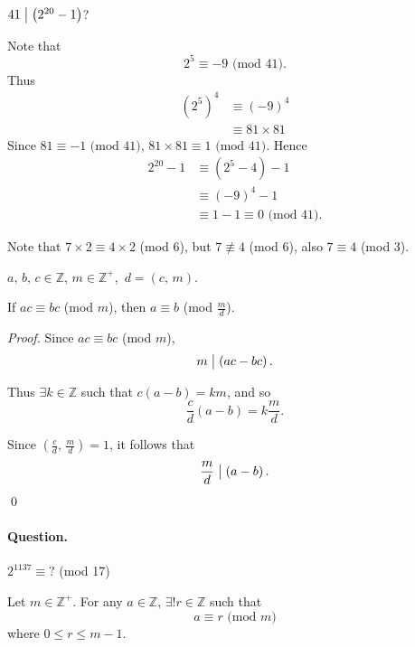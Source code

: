 \begin{example}
    $41 \bigm| \left(2^{20}-1\right)$?

    Note that
    \[
        2^5 \equiv -9 \mbox{ (mod 41)}.  
    \]
    Thus
    \begin{align*}
        \left(2^5\right)^4 &\equiv \left(-9\right)^4 \\
        &\equiv 81 \times 81
    \end{align*}
    Since $81 \equiv -1 \mbox{ (mod 41)}$, $81\times 81 \equiv 1 \mbox{ (mod 41)}$.
    Hence
    \begin{align*}
        2^{20}-1 &\equiv\left(2^5-4\right)-1 \\
        &\equiv \left(-9 \right)^4-1 \\
        &\equiv 1 - 1 \equiv 0 \mbox{ (mod 41)}.
    \end{align*}
\end{example}

Note that $7\times 2 \equiv 4 \times 2$ (mod 6), but $7 \not\equiv 4$ (mod 6),
also $7 \equiv 4$ (mod 3).

\begin{theorem}
    $a,\,b,\,c \in \mathbb{Z}$, $m \in \mathbb{Z}^+$,\, $d=\left(c,\,m\right)$.

    If $ac \equiv bc$ (mod $m$), then $a \equiv b$ (mod $\frac{m}{d}$).
\end{theorem}

\begin{proof}
    Since $ac \equiv bc$ (mod $m$),
    \[
        m \bigm| \left(ac-bc\right).    
    \]

    Thus $\exists k \in \mathbb{Z}$ such that $c\left(a-b\right)=km$,
    and so
    \[
        \frac{c}{d} \left(a-b\right) = k \frac{m}{d}.        
    \]

    Since $\left(\frac{c}{d},\,\frac{m}{d}\right)=1$, it follows that
    \[
        \frac{m}{d} \bigm| \left(a-b\right).    
    \]
    \qed
\end{proof}

\paragraph{Question.} $2^{1137} \equiv \mbox{?}$ (mod 17)

\begin{theorem}
    Let $m\in \mathbb{Z}^+$. For any $a\in \mathbb{Z}$, $\exists! r \in \mathbb{Z}$
    such that
    \[
        a \equiv r \mbox{ (mod $m$)}
    \]
    where $0 \leq r \leq m - 1$.
\end{theorem}

